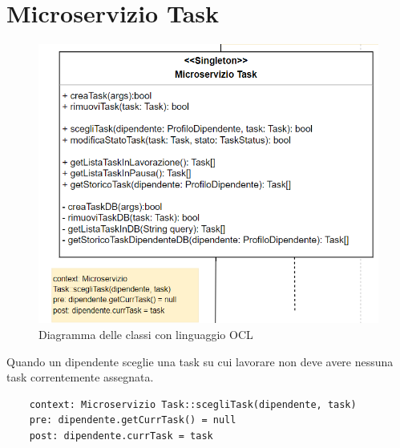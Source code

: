 \documentclass{report}
\begin{document}
\section{Microservizio Task}
\begin{figure}[H]
	\centering\includegraphics[width=1\textwidth]{images/OCL/OCL_task.png}
	Diagramma delle classi con linguaggio OCL 
\end{figure}
Quando un dipendente sceglie una task su cui lavorare non deve avere nessuna task correntemente assegnata.
\begin{verbatim}
	context: Microservizio Task::scegliTask(dipendente, task)
	pre: dipendente.getCurrTask() = null
	post: dipendente.currTask = task

\end{verbatim}
\end{document}
